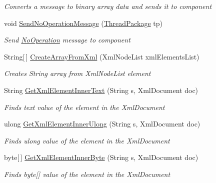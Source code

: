 \begin{DoxyCompactItemize}
\begin{DoxyCompactList}\small\item\em Converts a message to binary array data and sends it to component \end{DoxyCompactList}\item 
void \hyperlink{class_communication_server_1_1_message_dispatcher_a67a6a73f07f09f0fd7a3c081d58f034f}{Send\+No\+Operation\+Message} (\hyperlink{class_communication_server_1_1_thread_package}{Thread\+Package} tp)
\begin{DoxyCompactList}\small\item\em Send \hyperlink{class_no_operation}{No\+Operation} message to component \end{DoxyCompactList}\item 
String\mbox{[}$\,$\mbox{]} \hyperlink{class_communication_server_1_1_message_dispatcher_af80a513cfca1d67a3f255a1f66cc8da2}{Create\+Array\+From\+Xml} (Xml\+Node\+List xml\+Elements\+List)
\begin{DoxyCompactList}\small\item\em Creates String array from Xml\+Node\+List element \end{DoxyCompactList}\item 
String \hyperlink{class_communication_server_1_1_message_dispatcher_aaa3c65b929c052b2f7c12ff959e38b59}{Get\+Xml\+Element\+Inner\+Text} (String s, Xml\+Document doc)
\begin{DoxyCompactList}\small\item\em Finds text value of the element in the Xml\+Document \end{DoxyCompactList}\item 
ulong \hyperlink{class_communication_server_1_1_message_dispatcher_a9faadcb5411cd281c7d0c7e9e0ad547a}{Get\+Xml\+Element\+Inner\+Ulong} (String s, Xml\+Document doc)
\begin{DoxyCompactList}\small\item\em Finds ulong value of the element in the Xml\+Document \end{DoxyCompactList}\item 
byte\mbox{[}$\,$\mbox{]} \hyperlink{class_communication_server_1_1_message_dispatcher_a837b62b4f47be46c9f1a4ae3e8866820}{Get\+Xml\+Element\+Inner\+Byte} (String s, Xml\+Document doc)
\begin{DoxyCompactList}\small\item\em Finds byte\mbox{[}\mbox{]} value of the element in the Xml\+Document \end{DoxyCompactList}\item 

\end{DoxyCompactItemize}
